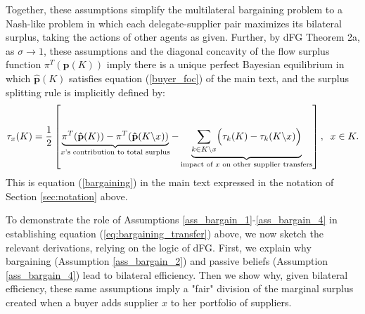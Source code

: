 \documentclass[12pt]{article} \usepackage{amsmath,amssymb,amsthm,geometry,graphicx,setspace,algorithm,algpseudocode,float}
\begin{document}
Together, these assumptions simplify the multilateral bargaining problem to a Nash-like problem in which each delegate-supplier pair maximizes its bilateral surplus, taking the actions of other agents as given. Further, by dFG Theorem 2a, as $\sigma \rightarrow 1$, these assumptions and the diagonal concavity of the flow surplus function $\pi^T(\mathbf{p}(K))$ imply there is a unique perfect Bayesian equilibrium in which $\mathbf{\hat{p}}(K)$ satisfies equation (\ref{buyer_foc}) of the main text, and the surplus splitting rule is implicitly defined by:
\begin{align}
\tau_x(K) = \frac{1}{2} \left[ \underbrace{\pi^T(\mathbf{\hat{p}}(K)) -  \pi^T(\mathbf{\hat{p}}(K\backslash x))}_{\text{$x$'s contribution to total surplus}}- \underbrace{\sum_{k \in K \backslash x}\Bigl(\tau_k(K)-\tau_k(K \backslash x)\Bigr)}_{\text{impact of $x$ on other supplier transfers}} \right],
\;\; x \in K. 
\label{eq:bargaining_transfer}
\end{align}
This is equation (\ref{bargaining}) in the main text expressed in the notation of Section \ref{sec:notation} above.

To demonstrate the role of Assumptions \ref{ass_bargain_1}-\ref{ass_bargain_4} in establishing equation  (\ref{eq:bargaining_transfer}) above, we now sketch the relevant derivations, relying on the logic of dFG. First, we explain why \citet{Binmore_etal1986}  bargaining (Assumption \ref{ass_bargain_2}) and passive beliefs (Assumption \ref{ass_bargain_4}) lead to bilateral efficiency. Then we show why, given bilateral efficiency, these same assumptions imply a "fair" division of the marginal surplus created when a buyer adds supplier $x$ to her portfolio of suppliers.
\end{document}
